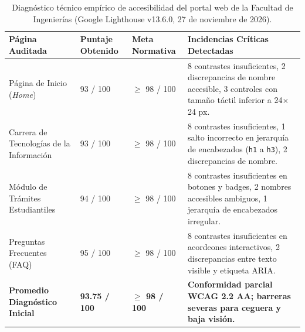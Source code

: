 \begin{table}[htbp]
  \centering
  \small
  \caption{Diagnóstico técnico empírico de accesibilidad del portal web de la Facultad de Ingenierías (Google Lighthouse v13.6.0, 27 de noviembre de 2026).}
  \label{tab:diagnostico_inicial}
  \setlength{\tabcolsep}{4pt}
  \renewcommand{\arraystretch}{1.25}
  \begin{tabular}{|p{}|p{}|p{}|p{}|}
    \hline
    \textbf{Página Auditada} & \textbf{Puntaje Obtenido} & \textbf{Meta Normativa} & \textbf{Incidencias Críticas Detectadas} \\
    \hline
    Página de Inicio (\textit{Home}) & 93 / 100 & $\ge$ 98 / 100 & 8 contrastes insuficientes, 2 discrepancias de nombre accesible, 3 controles con tamaño táctil inferior a 24$\times$24 px. \\
    \hline
    Carrera de Tecnologías de la Información & 93 / 100 & $\ge$ 98 / 100 & 8 contrastes insuficientes, 1 salto incorrecto en jerarquía de encabezados (\texttt{h1} a \texttt{h3}), 2 discrepancias de nombre. \\
    \hline
    Módulo de Trámites Estudiantiles & 94 / 100 & $\ge$ 98 / 100 & 8 contrastes insuficientes en botones y badges, 2 nombres accesibles ambiguos, 1 jerarquía de encabezados irregular. \\
    \hline
    Preguntas Frecuentes (FAQ) & 95 / 100 & $\ge$ 98 / 100 & 8 contrastes insuficientes en acordeones interactivos, 2 discrepancias entre texto visible y etiqueta ARIA. \\
    \hline
    \textbf{Promedio Diagnóstico Inicial} & \textbf{93.75 / 100} & \textbf{$\ge$ 98 / 100} & \textbf{Conformidad parcial WCAG 2.2 AA; barreras severas para ceguera y baja visión.} \\
    \hline
  \end{tabular}
\end{table}

